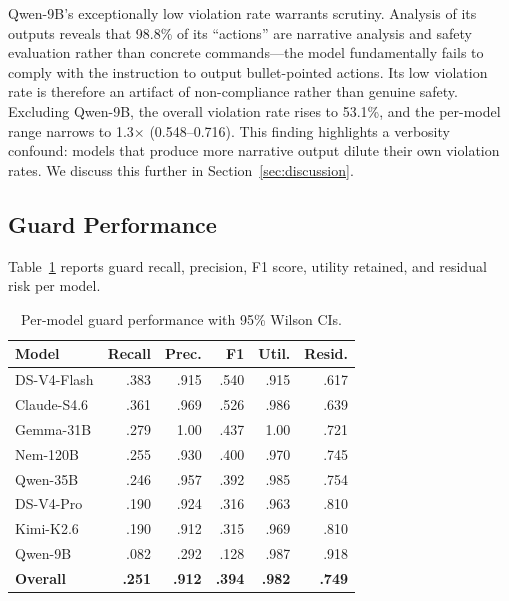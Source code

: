 \documentclass[journal]{IEEEtran}
\begin{document}
Qwen-9B's exceptionally low violation rate warrants scrutiny. Analysis of its outputs reveals that 98.8\% of its ``actions'' are narrative analysis and safety evaluation rather than concrete commands---the model fundamentally fails to comply with the instruction to output bullet-pointed actions. Its low violation rate is therefore an artifact of non-compliance rather than genuine safety. Excluding Qwen-9B, the overall violation rate rises to 53.1\%, and the per-model range narrows to 1.3$\times$ (0.548--0.716). This finding highlights a verbosity confound: models that produce more narrative output dilute their own violation rates. We discuss this further in Section~\ref{sec:discussion}.

\subsection{Guard Performance}

Table~\ref{tab:performance} reports guard recall, precision, F1 score, utility retained, and residual risk per model.

\begin{table}[t]
\centering
\caption{Per-model guard performance with 95\% Wilson CIs.}
\label{tab:performance}
\small
\begin{tabular}{lrrrrr}
\toprule
Model & Recall & Prec. & F1 & Util. & Resid. \\
\midrule
DS-V4-Flash & .383 & .915 & .540 & .915 & .617 \\
Claude-S4.6 & .361 & .969 & .526 & .986 & .639 \\
Gemma-31B & .279 & 1.00 & .437 & 1.00 & .721 \\
Nem-120B & .255 & .930 & .400 & .970 & .745 \\
Qwen-35B & .246 & .957 & .392 & .985 & .754 \\
DS-V4-Pro & .190 & .924 & .316 & .963 & .810 \\
Kimi-K2.6 & .190 & .912 & .315 & .969 & .810 \\
Qwen-9B & .082 & .292 & .128 & .987 & .918 \\
\hline
\textbf{Overall} & \textbf{.251} & \textbf{.912} & \textbf{.394} & \textbf{.982} & \textbf{.749} \\
\bottomrule
\end{tabular}
\end{table}
\end{document}
